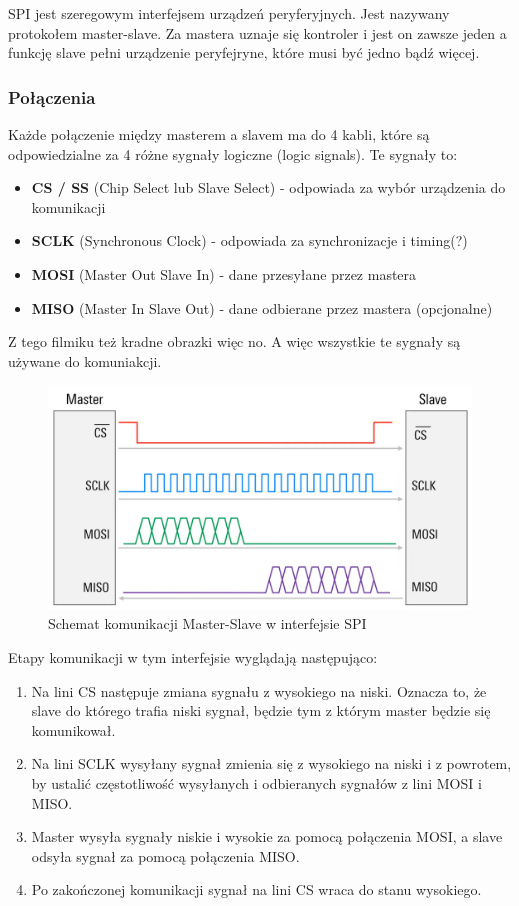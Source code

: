 \documentclass[11pt]{article}
\begin{document}
SPI jest szeregowym interfejsem urządzeń peryferyjnych. Jest nazywany
protokołem master-slave. Za mastera uznaje się kontroler i jest on zawsze
jeden a funkcję slave pełni urządzenie peryfejryne, które musi być jedno bądź więcej.
\subsubsection{Połączenia}
Każde połączenie między masterem a slavem ma do 4 kabli, które są odpowiedzialne
za 4 różne sygnały logiczne (logic signals). Te sygnały to:
\begin{itemize}
    \item {
        \textbf{CS / SS} (Chip Select lub Slave Select) - odpowiada za wybór 
        urządzenia do komunikacji
    }
    \item {
        \textbf{SCLK} (Synchronous Clock) - odpowiada za synchronizacje i timing(?)
    }
    \item {
        \textbf{MOSI} (Master Out Slave In) - dane przesyłane
        przez mastera
    }
    \item {
        \textbf{MISO} (Master In Slave Out) - dane odbierane przez
        mastera (opcjonalne)
    }
\end{itemize}
Z tego filmiku też kradne obrazki więc no. A więc wszystkie te sygnały są używane do komuniakcji.
\begin{figure}[H]
    \includegraphics[width=\textwidth]{SPI_communication.png}
    \caption{Schemat komunikacji Master-Slave w interfejsie SPI}
\end{figure}
Etapy komunikacji w tym interfejsie wyglądają następująco:
\begin{enumerate}
    \item {
        Na lini CS następuje zmiana sygnału z wysokiego na niski. Oznacza to, że slave
        do którego trafia niski sygnał, będzie tym z którym master będzie się komunikował.
    }
    \item {
        Na lini SCLK wysyłany sygnał zmienia się z wysokiego na niski i z powrotem, by ustalić
        częstotliwość wysyłanych i odbieranych sygnałów z lini MOSI i MISO.
    }
    \item {
        Master wysyła sygnały niskie i wysokie za pomocą połączenia MOSI, a slave odsyła sygnał
        za pomocą połączenia MISO.
    }
    \item {
        Po zakończonej komunikacji sygnał na lini CS wraca do stanu wysokiego.
    }
\end{enumerate}
\end{document}

